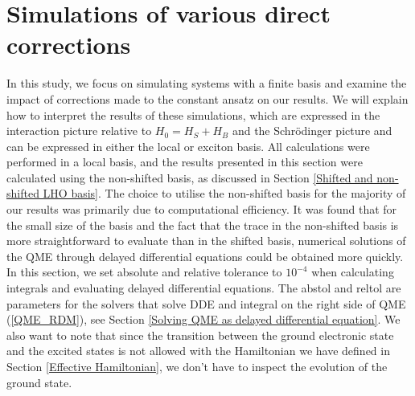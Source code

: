 \section{Simulations of various direct corrections}
\label{Simulations of various direct corrections}
In this study, we focus on simulating systems with a finite basis and examine the impact of corrections made to the constant ansatz on our results. We will explain how to interpret the results of these simulations, which are expressed in the interaction picture relative to $H_0=H_S+H_B$ and the Schrödinger picture and can be expressed in either the local or exciton basis. All calculations were performed in a local basis, and the results presented in this section were calculated using the non-shifted basis, as discussed in Section \ref{Shifted and non-shifted LHO basis}. The choice to utilise the non-shifted basis for the majority of our results was primarily due to computational efficiency. It was found that for the small size of the basis and the fact that the trace in the non-shifted basis is more straightforward to evaluate than in the shifted basis, numerical solutions of the QME through delayed differential equations could be obtained more quickly. In this section, we set absolute and relative tolerance to $10^{-4}$ when calculating integrals and evaluating delayed differential equations. The abstol and reltol are parameters for the solvers that solve DDE and integral on the right side of QME (\ref{QME_RDM}), see Section \ref{Solving QME as delayed differential equation}. We also want to note that since the transition between the ground electronic state and the excited states is not allowed with the Hamiltonian we have defined in Section \ref{Effective Hamiltonian}, we don't have to inspect the evolution of the ground state. 

